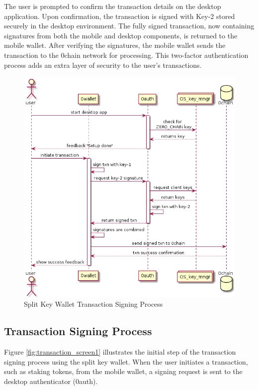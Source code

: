 The user is prompted to confirm the transaction details on the desktop application. Upon confirmation, the transaction is signed with Key-2 stored securely in the desktop environment. The fully signed transaction, now containing signatures from both the mobile and desktop components, is returned to the mobile wallet. After verifying the signatures, the mobile wallet sends the transaction to the 0chain network for processing. This two-factor authentication process adds an extra layer of security to the user's transactions.

\begin{figure}[h]
    \centering
    \includegraphics[width=\textwidth]{Images/transaction_diagram.png}
    \caption{Split Key Wallet Transaction Signing Process}
    \label{fig:transaction}
\end{figure}
\subsection{Transaction Signing Process}
Figure \ref{fig:transaction_screen1} illustrates the initial step of the transaction signing process using the split key wallet. When the user initiates a transaction, such as staking tokens, from the mobile wallet, a signing request is sent to the desktop authenticator (0auth).

